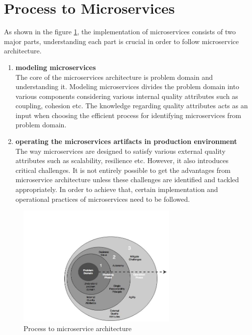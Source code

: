\section{Process to Microservices}\label{section:guidelines/process_to_microservices}
As shown in the figure \ref{fig:guidelines/chapter_nine_process}, the implementation of microservices consists of two major parts, understanding each part is crucial in order to follow microservice architecture.
\begin{enumerate}
\item \textbf{modeling microservices} \\
The core of the microservices architecture is problem domain and understanding it. Modeling microservices divides the problem domain into various components considering various internal quality attributes such as coupling, cohesion etc. The knowledge regarding quality attributes acts as an input when choosing the efficient process for identifying microservices from problem domain.
\item \textbf{operating the microservices artifacts in production environment} \\
The way microservices are designed to satisfy various external quality attributes such as scalability, resilience etc. However, it also introduces critical challenges. It is not entirely possible to get the advantages from microservice architecture unless these challenges are identified and tackled appropriately. In order to achieve that, certain implementation and operational practices of microservices need to be followed.
\end{enumerate}
\begin{figure}[H]
\begin{center}
\includegraphics[width=0.7\textwidth]{figures/chapter_nine_process}
\caption{Process to microservice architecture}
\label{fig:guidelines/chapter_nine_process}
\end{center}
\end{figure}
